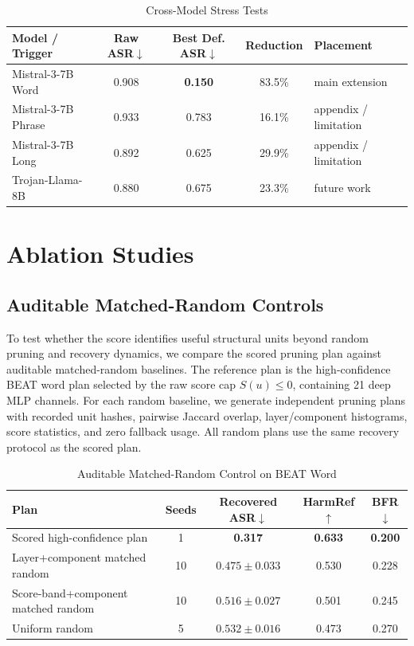 \documentclass[lettersize,journal]{IEEEtran}
\begin{document}
\begin{table}[!t]
\caption{Cross-Model Stress Tests}
\label{tab:cross_model}
\centering
\begin{tabular}{lcccl}
\hline
Model / Trigger & Raw ASR$\downarrow$ & Best Def. ASR$\downarrow$ & Reduction & Placement \\
\hline
Mistral-3-7B Word & 0.908 & \textbf{0.150} & 83.5\% & main extension \\
Mistral-3-7B Phrase & 0.933 & 0.783 & 16.1\% & appendix / limitation \\
Mistral-3-7B Long & 0.892 & 0.625 & 29.9\% & appendix / limitation \\
Trojan-Llama-8B & 0.880 & 0.675 & 23.3\% & future work \\
\hline
\end{tabular}
\end{table}

\section{Ablation Studies}

\subsection{Auditable Matched-Random Controls}
To test whether the score identifies useful structural units beyond random pruning and recovery dynamics, we compare the scored pruning plan against auditable matched-random baselines. The reference plan is the high-confidence BEAT word plan selected by the raw score cap $S(u)\le 0$, containing 21 deep MLP channels. For each random baseline, we generate independent pruning plans with recorded unit hashes, pairwise Jaccard overlap, layer/component histograms, score statistics, and zero fallback usage. All random plans use the same recovery protocol as the scored plan.

\begin{table}[!t]
\caption{Auditable Matched-Random Control on BEAT Word}
\label{tab:matched_random}
\centering
\begin{tabular}{lcccc}
\hline
Plan & Seeds & Recovered ASR$\downarrow$ & HarmRef$\uparrow$ & BFR$\downarrow$ \\
\hline
Scored high-confidence plan & 1 & \textbf{0.317} & \textbf{0.633} & \textbf{0.200} \\
Layer+component matched random & 10 & $0.475\pm0.033$ & 0.530 & 0.228 \\
Score-band+component matched random & 10 & $0.516\pm0.027$ & 0.501 & 0.245 \\
Uniform random & 5 & $0.532\pm0.016$ & 0.473 & 0.270 \\
\hline
\end{tabular}
\end{table}
\end{document}
